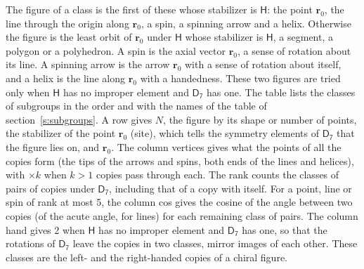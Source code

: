 \documentclass[10pt,a4paper]{article}
\numberwithin{equation}{section}
\newcommand{\grp}[1]{\mathsf{#1}}
\newcommand{\pointr}{\mathbf{r}}
\begin{document}
\leavevmode\label{n:head.figure}The figure of a class is the first of these whose stabilizer is $\grp{H}$: the point $\pointr_0$, the line through the origin along $\pointr_0$, a spin, a spinning arrow and a helix. Otherwise the figure is the least orbit of $\pointr_0$ under $\grp{H}$ whose stabilizer is $\grp{H}$, a segment, a polygon or a polyhedron. A spin is the axial vector $\pointr_0$, a sense of rotation about its line. A spinning arrow is the arrow $\pointr_0$ with a sense of rotation about itself, and a helix is the line along $\pointr_0$ with a handedness. These two figures are tried only when $\grp{H}$ has no improper element and $\grp{D_{7}}$ has one. The table lists the classes of subgroups in the order and with the names of the table of section~\ref{s:subgroups}. \label{n:head.site}A row gives $N$, the figure by its shape or number of points, the stabilizer of the point $\pointr_0$ (site), which tells the symmetry elements of $\grp{D_{7}}$ that the figure lies on, and $\pointr_0$. \label{n:head.vertices}The column vertices gives what the points of all the copies form (the tips of the arrows and spins, both ends of the lines and helices), with ${\times}k$ when $k > 1$ copies pass through each. \label{n:head.rank}The rank counts the classes of pairs of copies under $\grp{D_{7}}$, including that of a copy with itself. \label{n:head.cos}For a point, line or spin of rank at most 5, the column cos gives the cosine of the angle between two copies (of the acute angle, for lines) for each remaining class of pairs. \label{n:head.hand}The column hand gives 2 when $\grp{H}$ has no improper element and $\grp{D_{7}}$ has one, so that the rotations of $\grp{D_{7}}$ leave the copies in two classes, mirror images of each other. These classes are the left- and the right-handed copies of a chiral figure.
\end{document}
